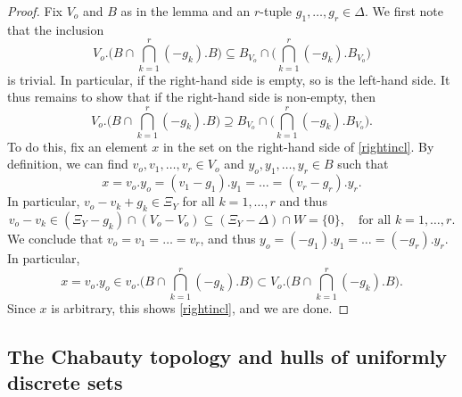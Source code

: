 \documentclass[12pt,reqno,a4paper]{amsart}
\numberwithin{equation}{section}
\theoremstyle{theorem}
\theoremstyle{task}
\theoremstyle{definition}
\begin{document}
\begin{proof}
Fix $V_o$ and $B$ as in the lemma and an $r$-tuple $g_1,\ldots,g_r \in \Delta$. We first note that the inclusion 
\[
V_o.\Big(B \cap \bigcap_{k=1}^r (-g_k).B\Big) \subseteq B_{V_o} \cap \Big( \bigcap_{k=1}^r (-g_k).B_{V_o}\Big)
\] 
is trivial. In particular, if the right-hand side is empty, so is the left-hand side. It thus remains to show that if the right-hand side is non-empty, then
\begin{equation}
\label{rightincl}
V_o.\Big(B \cap \bigcap_{k=1}^r (-g_k).B\Big) \supseteq B_{V_o} \cap \Big( \bigcap_{k=1}^r (-g_k).B_{V_o}\Big).
\end{equation}
To do this, fix an element $x$ in the set on the right-hand side of \eqref{rightincl}. By definition, we can find $v_o,v_1,\ldots,v_r \in V_o$ and $y_o,y_1,\ldots,y_r \in B$ such that
\[
x = v_o.y_o = (v_1-g_1).y_1 = \ldots = (v_r - g_r).y_r.
\]
In particular, $v_o - v_k + g_k \in \Xi_Y$ for all $k=1,\ldots,r$ and thus
\[
v_o - v_k \in (\Xi_Y - g_k) \cap (V_o - V_o) \subseteq (\Xi_Y - \Delta) \cap W = \{0\}, \quad \textrm{for all $k=1,\ldots, r$}.
\]
We conclude that $v_o = v_1 = \ldots = v_r$, and thus $y_o = (-g_1).y_1 = \ldots = (-g_r).y_r$. In particular, 
\[
x = v_o.y_o \in v_o.\Big(B \cap \bigcap_{k=1}^r (-g_k).B\Big) \subset V_o.\Big(B \cap \bigcap_{k=1}^r (-g_k).B\Big).
\]
Since $x$ is arbitrary, this shows \eqref{rightincl}, and we are done.
\end{proof}


\subsection{The Chabauty topology and hulls of uniformly discrete sets}
\label{subsec:cha}
\end{document}
